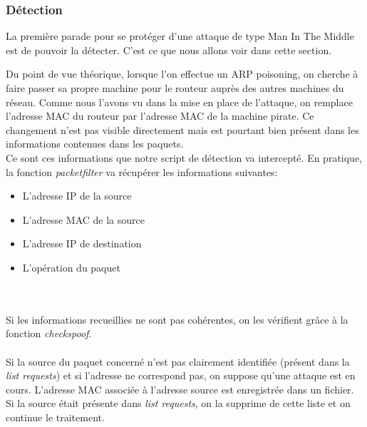 \documentclass[11pt]{article}
\begin{document}
\subsubsection{Détection}

La première parade pour se protéger d'une attaque de type Man In The Middle est de pouvoir la détecter. C'est ce que nous allons voir dans cette section. 

Du point de vue théorique, lorsque l'on effectue un ARP poisoning, on cherche à faire passer sa propre machine pour le routeur auprès des autres machines du réseau. Comme nous l'avons vu dans la mise en place de l'attaque, on remplace l'adresse MAC du routeur par l'adresse MAC de la machine pirate. Ce changement n'est pas visible directement mais est pourtant bien présent dans les informations contenues dans les paquets. ~\\
Ce sont ces informations que notre script de détection va intercepté. En pratique, la fonction \textit{packetfilter} va récupérer les informations suivantes: ~\\
\begin{itemize}
	\item L'adresse IP de la source
	\item L'adresse MAC de la source
	\item L'adresse IP de destination
	\item L'opération du paquet
\end{itemize} ~\\
~\\

Si les informations recueillies ne sont pas cohérentes, on les vérifient grâce à la fonction \textit{checkspoof}. ~\\
~\\

Si la source du paquet concerné n'est pas clairement identifiée (présent dans la \textit{list requests}) et si l'adresse ne correspond pas, on suppose qu'une attaque est en cours. L'adresse MAC associée à l'adresse source est enregistrée dans un fichier.
Si la source était présente dans \textit{list requests}, on la supprime de cette liste et on continue le traitement.~\\
~\\
\end{document}
